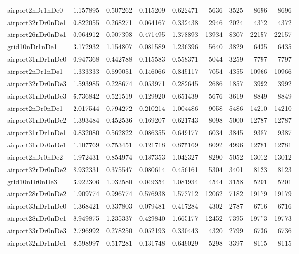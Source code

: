 \begin{longtable}{|l|r|r|r|r|r|r|r|r|}
airport2nDr1nDe0 & 1.157895 & 0.507262 & 0.115209 & 0.622471 & 5636 & 3525 & 8696 & 8696 \\
airport32nDr0nDe1 & 0.822055 & 0.268271 & 0.064167 & 0.332438 & 2946 & 2024 & 4372 & 4372 \\
airport26nDr0nDe1 & 0.964912 & 0.907398 & 0.471495 & 1.378893 & 13934 & 8307 & 22157 & 22157 \\
grid10nDr1nDe1 & 3.172932 & 1.154807 & 0.081589 & 1.236396 & 5640 & 3829 & 6435 & 6435 \\
airport31nDr1nDe0 & 0.947368 & 0.442788 & 0.115583 & 0.558371 & 5044 & 3259 & 7797 & 7797 \\
airport2nDr1nDe1 & 1.333333 & 0.699051 & 0.146066 & 0.845117 & 7054 & 4355 & 10966 & 10966 \\
airport32nDr0nDe3 & 1.593985 & 0.228674 & 0.053971 & 0.282645 & 2686 & 1857 & 3992 & 3992 \\
airport31nDr0nDe3 & 6.736842 & 0.521519 & 0.129920 & 0.651439 & 5676 & 3619 & 8849 & 8849 \\
airport2nDr0nDe1 & 2.017544 & 0.794272 & 0.210214 & 1.004486 & 9058 & 5486 & 14210 & 14210 \\
airport31nDr0nDe2 & 1.393484 & 0.452536 & 0.169207 & 0.621743 & 8098 & 5000 & 12787 & 12787 \\
airport31nDr1nDe1 & 0.832080 & 0.562822 & 0.086355 & 0.649177 & 6034 & 3845 & 9387 & 9387 \\
airport31nDr0nDe1 & 1.107769 & 0.753451 & 0.121718 & 0.875169 & 8092 & 4996 & 12781 & 12781 \\
airport2nDr0nDe2 & 1.972431 & 0.854974 & 0.187353 & 1.042327 & 8290 & 5052 & 13012 & 13012 \\
airport32nDr0nDe2 & 8.932331 & 0.375547 & 0.080614 & 0.456161 & 5304 & 3401 & 8123 & 8123 \\
grid10nDr0nDe3 & 3.922306 & 1.032580 & 0.049354 & 1.081934 & 4544 & 3158 & 5201 & 5201 \\
airport28nDr0nDe2 & 1.909774 & 0.996774 & 0.576938 & 1.573712 & 12062 & 7182 & 19179 & 19179 \\
airport33nDr1nDe0 & 1.368421 & 0.337803 & 0.079481 & 0.417284 & 4302 & 2787 & 6716 & 6716 \\
airport28nDr0nDe1 & 8.949875 & 1.235337 & 0.429840 & 1.665177 & 12452 & 7395 & 19773 & 19773 \\
airport33nDr0nDe3 & 2.796992 & 0.278250 & 0.052193 & 0.330443 & 4320 & 2799 & 6736 & 6736 \\
airport32nDr1nDe1 & 8.598997 & 0.517281 & 0.131748 & 0.649029 & 5298 & 3397 & 8115 & 8115 \\

\end{longtable}
